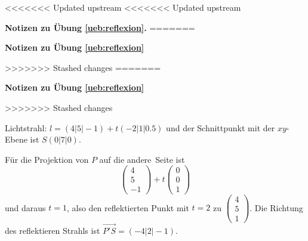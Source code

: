 \documentclass[%
11pt,%
twoside,%
titlepage,%
<<<<<<< Updated upstream
<<<<<<< Updated upstream
german,%
=======
swissgerman,%
>>>>>>> Stashed changes
=======
swissgerman,%
>>>>>>> Stashed changes
headsepline%
]{scrartcl}
\newcommand{\faReturnGray}{\textcolor{gray}{\faMailReply}} %
\newcommand{\faReturnGray}{\textcolor{gray}{\faMailReply}} %
\theoremstyle{definition}
\theoremstyle{plain}
\newcommand{\concatueb}[1]{ueb:#1}%
\newcommand{\concatlsg}[1]{lsg:#1}%
\newenvironment{lsg}[1]{%
<<<<<<< Updated upstream
<<<<<<< Updated upstream
    \par\noindent\textbf{Notizen zu Übung \ref{\concatueb{#1}}.}%
    \label{\concatlsg{#1}}
=======
    \par\noindent\textbf{Notizen zu Übung \ref{\concatueb{#1}}}\label{\concatlsg{#1}}
    \hfill\hyperref[\concatueb{#1}]{\faReturnGray}\par %
>>>>>>> Stashed changes
=======
    \par\noindent\textbf{Notizen zu Übung \ref{\concatueb{#1}}}\label{\concatlsg{#1}}
    \hfill\hyperref[\concatueb{#1}]{\faReturnGray}\par %
>>>>>>> Stashed changes
}{%
    \par%
}
\begin{document}
\begin{lsg}{reflexion}
Lichtstrahl: $l=(4|5|-1)+t(-2|1|0.5)$ und der Schnittpunkt mit der $xy$-Ebene ist $S(0|7|0)$.

Für die Projektion von $P$ auf die \glqq andere\grqq\ Seite ist
$$\begin{pmatrix}
    4\\5\\-1
\end{pmatrix}+t\begin{pmatrix}
    0\\0\\1
\end{pmatrix}$$
und daraus $t=1$, also den reflektierten Punkt mit $t=2$ zu $\begin{pmatrix}
    4\\5\\1
\end{pmatrix}$. Die Richtung des reflektieren Strahls ist $\vec{P'S}=(-4|2|-1)$.
\end{lsg}
\end{document}
